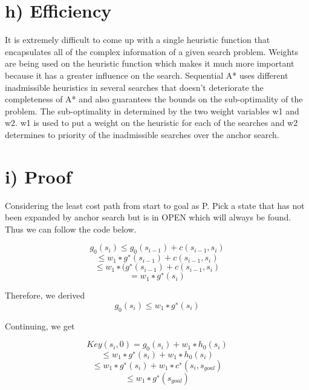 \documentclass[a4paper]{article}
\begin{document}
\section*{h) Efficiency}

It is extremely difficult to come up with a single heuristic function that encapsulates all of the complex information of a given search problem. Weights are being used on the heuristic function which makes it much more important because it has a greater influence on the search. Sequential A* uses different inadmissible heuristics in several searches that doesn't deteriorate the completeness of A* and also guarantees the bounds on the sub-optimality of the problem. The sub-optimality in determined by the two weight variables w1 and w2. w1 is used to put a weight on the heuristic for each of the searches and w2 determines to priority of the inadmissible searches over the anchor search.
\section*{i) Proof}

Considering the least cost path from start to goal as P. Pick a state that has not been expanded by anchor search but is in OPEN which will always be found. Thus we can follow the code below.

\begin{equation}
g_{0}(s_{i}) ≤ g_{0}(s_{i−1}) + c(s_{i−1}, s_{i}) 
\end{equation}
\begin{equation}
≤ w_{1} ∗ g^{∗}(s_{i−1}) + c(s_{i−1}, s_{i}) 
\end{equation}
\begin{equation}
≤ w_{1} ∗ (g^{∗} (s_{i−1}) + c(s_{i−1}, s_{i})
\end{equation}
\begin{equation}
= w_{1} ∗ g^{∗}(s_{i})
\end{equation}

Therefore, we derived 
\begin{equation}
g_{0}(s_{i}) ≤ w_{1} ∗ g^{∗}(s_{i})
\end{equation}

Continuing, we get

\begin{equation}
Key(s_{i}, 0) = g_{0}(s_{i}) + w_{1} ∗ h_{0}(s_{i})
\end{equation}
\begin{equation}
≤ w_{1} ∗ g^{∗}(s_{i}) + w_{1} ∗ h_{0}(s_{i})
\end{equation}
\begin{equation}
≤ w_{1} ∗ g^{∗}(s_{i}) + w_{1} ∗ c^{∗}(s_{i}, s_{goal})
\end{equation}
\begin{equation}
≤ w_{1} ∗ g^{∗}(s_{goal})
\end{equation}
\end{document}
